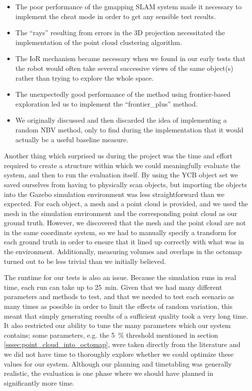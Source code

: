 \begin{itemize}
	\item The poor performance of the gmapping SLAM system made it necessary to implement the cheat mode in order to get any sensible test results.
	\item The ``rays'' resulting from errors in the 3D projection necessitated the implementation of the point cloud clustering algorithm.
	\item The IoR mechanism became necessary when we found in our early tests that the robot would often take several successive views of the same object(s) rather than trying to explore the whole space.
	\item The unexpectedly good performance of the method using frontier-based exploration led us to implement the ``frontier\_plus'' method.
	\item We originally discussed and then discarded the idea of implementing a random NBV method, only to find during the implementation that it would actually be a useful baseline measure.
\end{itemize}


Another thing which surprised us during the project was the time and effort required to create a structure within which we could meaningfully evaluate the system, and then to run the evaluation itself.
By using the YCB object set we saved ourselves from having to physically scan objects, but importing the objects into the Gazebo simulation environment was less straightforward than we expected.
For each object, a mesh and a point cloud is provided, and we used the mesh in the simulation environment and the corresponding point cloud as our ground truth.
However, we discovered that the mesh and the point cloud are not in the same coordinate system, so we had to manually specify a transform for each ground truth in order to ensure that it lined up correctly with what was in the environment.
Additionally, measuring volumes and overlaps in the octomap turned out to be less trivial than we initially believed.

The runtime for our tests is also an issue. Because the simulation runs in real time, each run can take up to \SI{25}{\minute}.
Given that we had many different parameters and methods to test, and that we needed to test each scenario as many times as possible in order to limit the effects of random variation, this meant that simply generating results of a sufficient quality took a very long time.
It also restricted our ability to tune the many parameters which our system contains; some parameters, e.g. the \SI{5}{\percent} threshold mentioned in section \ref{sssec:point_cloud_into_octomap}, were taken directly from the literature and we did not have time to thoroughly explore whether we could optimize these values for our system.
Although our planning and timetabling was generally realistic, the evaluation is one phase where we should have planned in significantly more time.

